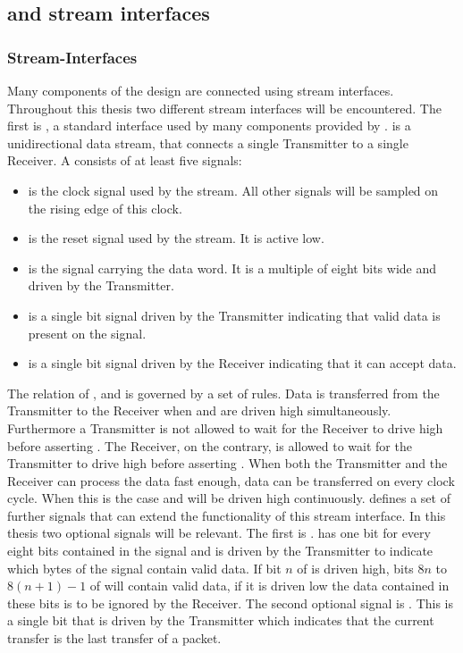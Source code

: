 
\subsection{\AXI{} and stream interfaces}
\subsubsection{Stream-Interfaces}
Many components of the \FPGA{} design are connected using stream interfaces. Throughout this thesis two different stream interfaces will be encountered. The first is \AXIStream{}\autocite{ref:axi_stream}, a standard interface used by many components provided by \Xilinx{}.
\AXIStream{} is a unidirectional data stream, that connects a single Transmitter to a single Receiver. A \AXIStream{} consists of at least five signals:
\begin{itemize}
    \item \ACLK{} is the clock signal used by the stream. All other signals will be sampled on the rising edge of this clock.
    \item \ARESETn{} is the reset signal used by the stream. It is active low.
    \item \TDATA{} is the signal carrying the data word. It is a multiple of eight bits wide and driven by the Transmitter.
    \item \TVALID{} is a single bit signal driven by the Transmitter indicating that valid data is present on the \TDATA{} signal.
    \item \TREADY{} is a single bit signal driven by the Receiver indicating that it can accept data.
\end{itemize}
The relation of \TDATA{}, \TVALID{} and \TREADY{} is governed by a set of rules.
Data is transferred from the Transmitter to the Receiver when \TREADY{} and \TVALID{} are driven high simultaneously.
Furthermore a Transmitter is not allowed to wait for the Receiver to drive \TREADY{} high before asserting \TVALID{}. The Receiver, on the contrary, is allowed to wait for the Transmitter to drive \TVALID{} high before asserting \TREADY{}.
When both the Transmitter and the Receiver can process the data fast enough, data can be transferred on every clock cycle. When this is the case \TREADY{} and \TVALID{} will be driven high continuously.
\AXIStream{} defines a set of further signals that can extend the functionality of this stream interface. In this thesis two optional signals will be relevant.
The first is \TKEEP{}. \TKEEP{} has one bit for every eight bits contained in the \TDATA{} signal and is driven by the Transmitter to indicate which bytes of the \TDATA{} signal contain valid data.
If bit $n$ of \TKEEP{} is driven high, bits $8n$ to $8(n + 1) - 1$ of \TDATA{} will contain valid data, if it is driven low the data contained in these bits is to be ignored by the Receiver.
The second optional signal is \TLAST{}. This is a single bit that is driven by the Transmitter which indicates that the current transfer is the last transfer of a packet.

